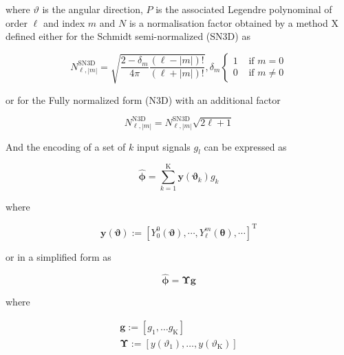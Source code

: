 \documentclass[a4paper, 10pt, twocolumn]{article}
\begin{document}
where $\vartheta$ is the angular direction, $P$ is the associated Legendre polynominal of order $\ell$ and index $m$ and $N$ is a normalisation factor obtained by a method X defined either for the Schmidt semi-normalized (SN3D) as

\begin{equation}\label{eq:sn3d}
N_{\ell, |m|}^{\mathrm{SN3D}}=\sqrt{\frac{2-\delta_{m}}{4 \pi}\frac{(\ell-|m|) !}{(\ell+|m|) !}}, \delta_{m}\left\{\begin{array}{ll}{1} & {\text { if } m=0} \\ {0} & {\text { if } m \neq 0}\end{array}\right.
\end{equation}

or for the Fully normalized form (N3D) with an additional factor

\begin{equation}\label{eq:n3d}
    N_{\ell, |m|}^{\mathrm{N} 3 \mathrm{D}}=N_{\ell, |m|}^{\mathrm{SN} 3 \mathrm{D}} \sqrt{2 \ell+1}
\end{equation}

And the encoding of a set of $k$ input signals $g_{l}$ can be expressed as

\begin{equation}
\hat{\boldsymbol{\phi}}=\sum_{k=1}^{\mathrm{K}} \boldsymbol{y}\left(\boldsymbol{\vartheta}_{k}\right) g_{k}
\end{equation}

where


\begin{equation*}
\boldsymbol{y}(\boldsymbol{\vartheta}) :=\left[Y_{0}^{0}(\boldsymbol{\vartheta}), \cdots, Y_{\ell}^{m}(\boldsymbol{\theta}), \cdots\right]^{\mathrm{T}}
\end{equation*}

or in a simplified form as

\begin{equation}
\hat{\boldsymbol{\phi}}=\boldsymbol{\Upsilon} \boldsymbol{g}
\end{equation}

where

\begin{equation*}
\begin{array}{l}{\boldsymbol{g} :=\left[g_{1}, \ldots g_{\mathrm{K}}\right]} \\ {\boldsymbol{\Upsilon} :=\left[y\left(\vartheta_{1}\right), \ldots, y\left(\vartheta_{\mathrm{K}}\right)\right]}\end{array}
\end{equation*}
\end{document}
